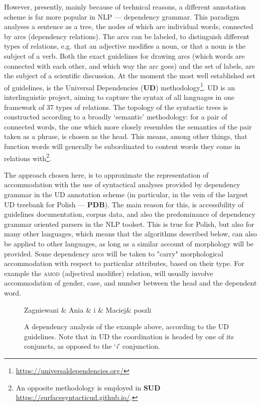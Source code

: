 \documentclass[12pt]{article}
\newcommand{\inlinegloss}[1]{`\textit{#1}'}
\begin{document}
However, presently, mainly because of technical reasons, a different annotation scheme is far more popular in NLP --- dependency grammar. This paradigm analyses a sentence as a tree, the nodes of which are individual words, connected by arcs (dependency relations). The arcs can be labeled, to distinguish different types of relations, e.g. that an adjective modifies a noun, or that a noun is the subject of a verb. Both the exact guidelines for drawing arcs (which words are connected with each other, and which way the arc goes) and the set of labels, are the subject of a scientific discussion. At the moment the most well established set of guidelines, is the Universal Dependencies (\textbf{UD}) methodology\footnote{\url{https://universaldependencies.org/}}. UD is an interlinguistic project, aiming to capture the syntax of all languages in one framework of 37 types of relations. The topology of the syntactic trees is constructed according to a broadly `semantic' methodology: for a pair of connected words, the one which more closely resembles the semantics of the pair taken as a phrase, is chosen as the head. This means, among other things, that function words will generally be subordinated to content words they come in relations with\footnote{An opposite methodology is employed in \textbf{SUD} \url{https://surfacesyntacticud.github.io/}.}.

The approach chosen here, is to approximate the representation of accommodation with the use of syntactical analyses provided by dependency grammar in the UD annotation scheme (in particular, in the vein of the largest UD treebank for Polish --- \textbf{PDB}\cite{wrob:18}). The main reason for this, is accessibility of guidelines documentation, corpus data, and also the predominance of dependency grammar oriented parsers in the NLP toolset. This is true for Polish, but also for many other languages, which means that the algorithms described below, can also be applied to other languages, as long as a similar account of morphology will be provided. Some dependency arcs will be taken to "carry" morphological accommodation with respect to particular attributes, based on their type. For example the \textsc{amod} (adjectival modifier) relation, will usually involve accommodation of gender, case, and number between the head and the dependent word.

\begin{figure}[H]
\centering
\begin{dependency}[edge slant=0]
\begin{deptext}[column sep=0.5cm]
Zagniewani \& Ania \& i \& Maciej\& poszli \\
\end{deptext}
\end{dependency}
\caption{A dependency analysis of the example above, according to the UD guidelines. Note that in UD the coordination is headed by one of its conjuncts, as opposed to the \inlinegloss{i} conjunction.}
\end{figure}
\end{document}
